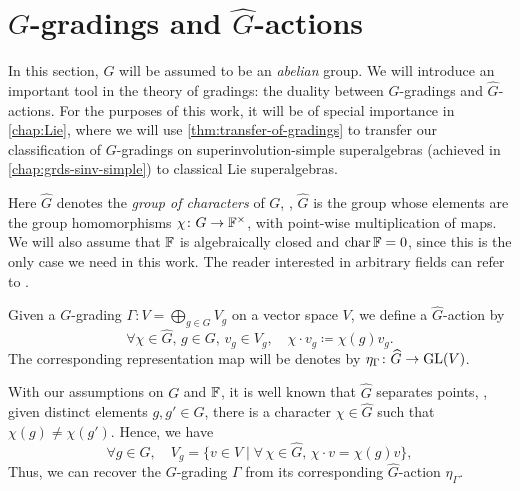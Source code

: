 \section{\texorpdfstring{$G$}{G}-gradings and \texorpdfstring{$\widehat{G}$}{G-hat}-actions}\label{sec:g-hat-action}

In this section, $G$ will be assumed to be an \emph{abelian} group. 
We will introduce an important tool in the theory of gradings: the duality between $G$-gradings and $\widehat G$-actions. 
For the purposes of this work, it will be of special importance in \cref{chap:Lie}, where we will use \cref{thm:transfer-of-gradings} to transfer our classification of $G$-gradings on superinvolution-simple superalgebras (achieved in \cref{chap:grds-sinv-simple}) to classical Lie superalgebras.

Here $\widehat G$ denotes the \emph{group of characters} of $G$, \ie, $\widehat G$ is the group whose elements are the group homomorphisms $\chi\colon G \to \mathbb{F}^\times$, with point-wise multiplication of maps. 
We will also assume that $\mathbb{F}$ is algebraically closed and $\operatorname{char} \mathbb{F} = 0$, since this is the only case we need in this work. 
The reader interested in arbitrary fields can refer to \cite{livromicha}. 


\begin{defi}
    Given a $G$-grading $\Gamma : V = \bigoplus_{g\in G} V_g$ on a vector space $V$, we define a $\widehat G$-action by
    \[
        \forall \chi \in \widehat G, \, g\in G, \, v_g \in V_g, \quad \chi \cdot v_g \coloneqq \chi(g) v_g. 
    \]
    The corresponding representation map will be denotes by $\eta_\Gamma \colon \widehat G \to \operatorname{GL} (V)$. 
\end{defi}

With our assumptions on $G$ and $\mathbb{F}$, it is well known that $\widehat G$ separates points, \ie, given distinct elements $g, g'\in G$, there is a character $\chi \in \widehat G$ such that $\chi(g) \neq \chi(g')$. 
Hence, we have 
\[
    \forall g\in G, \quad V_g = \{ v\in V \mid \forall\, \chi \in \widehat G, \, \chi \cdot v = \chi(g)v \},
\]
Thus, we can recover the $G$-grading $\Gamma$ from its corresponding $\widehat G$-action $\eta_\Gamma$. 

